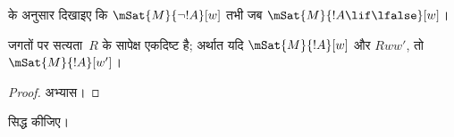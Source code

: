 \documentclass[../../../include/open-logic-section]{subfiles}
\begin{document}
\begin{prob}
   के अनुसार दिखाइए कि
  $\mSat{M}{\lnot !A}[w]$ तभी जब $\mSat{M}{!A \lif \lfalse}[w]$।
\end{prob}

\begin{prop}
  जगतों पर सत्यता~$R$ के सापेक्ष एकदिष्ट है; अर्थात यदि
  $\mSat{M}{!A}[w]$ और $Rww'$, तो $\mSat{M}{!A}[w']$।
\end{prop}

\begin{proof}
  अभ्यास।
\end{proof}

\begin{prob}
   सिद्ध कीजिए।
\end{prob}
\end{document}
